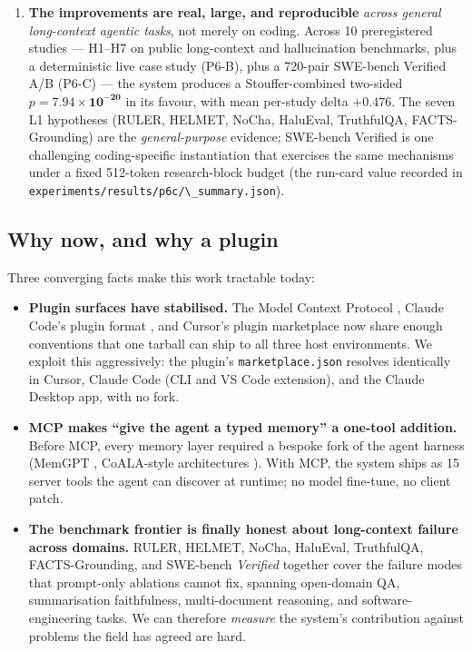 \begin{enumerate}
\item
  \textbf{The improvements are real, large, and reproducible} \emph{across general long-context agentic tasks}, not merely on coding. Across 10 preregistered studies --- H1--H7 on public long-context and hallucination benchmarks, plus a deterministic live case study (P6-B), plus a 720-pair SWE-bench Verified A/B (P6-C) --- the system produces a Stouffer-combined two-sided \(p = \mathbf{7.94 \times 10^{-20}}\) in its favour, with mean per-study delta \(\mathbf{+0.476}\). The seven L1 hypotheses (RULER, HELMET, NoCha, HaluEval, TruthfulQA, FACTS-Grounding) are the \emph{general-purpose} evidence; SWE-bench Verified is one challenging coding-specific instantiation that exercises the same mechanisms under a fixed 512-token research-block budget (the run-card value recorded in \passthrough{\lstinline!experiments/results/p6c/\_summary.json!}).
\end{enumerate}

\subsection{Why now, and why a plugin}\label{why-now-and-why-a-plugin}

Three converging facts make this work tractable today:

\begin{itemize}
\item
  \textbf{Plugin surfaces have stabilised.} The Model Context Protocol \citep{anthropic2025mcp}, Claude Code's plugin format \citep{anthropic2025claudecode}, and Cursor's plugin marketplace \citep{cursor2025plugins} now share enough conventions that one tarball can ship to all three host environments. We exploit this aggressively: the plugin's \passthrough{\lstinline!marketplace.json!} resolves identically in Cursor, Claude Code (CLI and VS Code extension), and the Claude Desktop app, with no fork.
\item
  \textbf{MCP makes ``give the agent a typed memory'' a one-tool addition.} Before MCP, every memory layer required a bespoke fork of the agent harness (MemGPT \citep{packer2023memgpt}, CoALA-style architectures \citep{sumers2024coala}). With MCP, the system ships as 15 server tools the agent can discover at runtime; no model fine-tune, no client patch.
\item
  \textbf{The benchmark frontier is finally honest about long-context failure across domains.} RULER, HELMET, NoCha, HaluEval, TruthfulQA, FACTS-Grounding, and SWE-bench \emph{Verified} together cover the failure modes that prompt-only ablations cannot fix, spanning open-domain QA, summarisation faithfulness, multi-document reasoning, and software-engineering tasks. We can therefore \emph{measure} the system's contribution against problems the field has agreed are hard.
\end{itemize}

